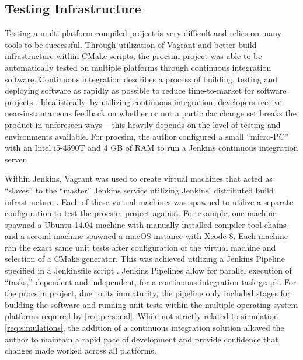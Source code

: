 \subsection{Testing Infrastructure}

Testing a multi-platform compiled project is very difficult and relies on many tools to be successful. Through utilization of Vagrant and better build infrastructure within CMake scripts, the procsim project was able to be automatically tested on multiple platforms through continuous integration software. Continuous integration describes a process of building, testing and deploying software as rapidly as possible to reduce time-to-market for software projects \cite{Stolberg2009}. Idealistically, by utilizing continuous integration, developers receive near-instantaneous feedback on whether or not a particular change set breaks the product in unforeseen ways -- this heavily depends on the level of testing and environments available. For procsim, the author configured a small ``micro-PC'' with an Intel \textregistered{} i5-4590T and 4 GB of RAM to run a Jenkins \cite{Jenkins:Home} continuous integration server. 

Within Jenkins, Vagrant was used to create virtual machines that acted as ``slaves'' to the ``master'' Jenkins service utilizing Jenkins' distributed build infrastructure \cite{Jenkins:DistributedBuilds}. Each of these virtual machines was spawned to utilize a separate configuration to test the procsim project against. For example, one machine spawned a Ubuntu 14.04 machine with manually installed compiler tool-chains and a second machine spawned a macOS instance with Xcode 8. Each machine ran the exact same unit tests after configuration of the virtual machine and selection of a CMake generator. This was achieved utilizing a Jenkins Pipeline \cite{Jenkins:Pipeline} specified in a Jenkinsfile script \cite{Jenkins:Pipeline:Jenkinsfile}. Jenkins Pipelines allow for parallel execution of ``tasks,'' dependent and independent, for a continuous integration task graph. For the procsim project, due to its immaturity, the pipeline only included stages for building the software and running unit tests within the multiple operating system platforms required by \cref{req:personal}. While not strictly related to simulation \cref{req:simulations}, the addition of a continuous integration solution allowed the author to maintain a rapid pace of development and provide confidence that changes made worked across all platforms.  

